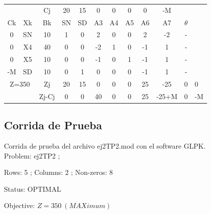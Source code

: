 \documentclass[a4paper,10pt]{article}
\begin{document}
\begin{center}
 \begin{tabular}{| c c c | c  c  c  c  c  c  c  c |}
    \hline
     	&			&   Cj   &   20    &   15    &   0    &   0    &   0    &   0    &   -M   &	       \\ 
    Ck 	&   Xk			&   Bk   &   SN    &   SD    &   A3   &   A4   &   A5   &   A6   &   A7   &  $\theta$    \\ \hline
    0   &   SN			&   10   &   1     &   0     &   2    &   0    &   0    &   2    &  -2    &   -  		\\
    0 	&   X4			&   40   &   0     &   0     &  -2    &   1    &   0    &  -1    &   1    &   -	        \\ 
    0 	&   X5			&   10   &   0     &   0     &  -1    &   0    &   1    &  -1    &   1    &   - 		\\ 
   -M 	&   SD			&   10   &   0     &   1     &   0    &   0    &   0    &  -1    &   1    &   -  		\\ \hline
\multicolumn{2}{|c|}{Z=350}	& Zj 	 &   20    &   15    &   0    &   0    &   0    &   25   &  -25   &   0   &   0    	&    		\\ 
 \multicolumn{2}{|c|}{}		& Zj-Cj  &   0     &   0     &   40   &   0    &   0    &   25   &  -25+M &   0    		&   -M   &    \\ 
    \hline
 \end{tabular}
\end{center}

\subsection{Corrida de Prueba}
Corrida de prueba del archivo ej2TP2.mod con el software GLPK.\\


Problem:     ej2TP2 ;

Rows:        5  ; Columns:     2 ; Non-zeros:   8 

Status:      OPTIMAL 

Objective:   $Z    =   350 \   (MAXimum) $
\end{document}
